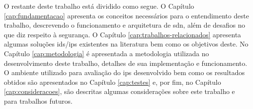 O restante deste trabalho está dividido como segue. O Capítulo \ref{cap:fundamentacao} apresenta os conceitos necessários para o entendimento deste trabalho, descrevendo o funcionamento e arquitetura de \gls{sdn}, além de desafios no que diz respeito à segurança. O Capítulo \ref{cap:trabalhos-relacionados} apresenta algumas soluções \gls{ids}/\gls{ips} existentes na literatura bem como os objetivos deste. No Capítulo \ref{cap:metodologia} é apresentada a metodologia utilizada no desenvolvimento deste trabalho, detalhes de sua implementação e funcionamento. O ambiente utilizado para avaliação do \gls{ips} desenvolvido bem como os resultados obtidos são apresentados no Capítulo \ref{cap:testes} e, por fim, no Capítulo \ref{cap:consideracoes}, são descritas algumas considerações sobre este trabalho e para trabalhos futuros.